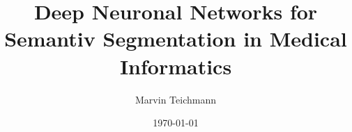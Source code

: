 \documentclass[11pt, a4paper,twocolumn, DIV=14]{scrartcl} %
\title{Deep Neuronal Networks for Semantiv Segmentation in Medical Informatics}
\author{Marvin Teichmann}
\date{\today}
\begin{document}
\maketitle




%

\cite{Dillmann2008}



\newpage


\printglossaries%
\end{document}

